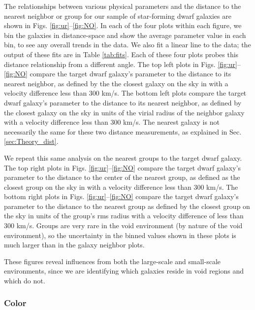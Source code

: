 The relationships between various physical parameters and the distance to the 
nearest neighbor or group for our sample of star-forming dwarf galaxies are 
shown in Figs. \ref{fig:ur}--\ref{fig:NO}.  In each of the four plots within 
each figure, we bin the galaxies in distance-space and show the average 
parameter value in each bin, to see any overall trends in the data.  We also fit 
a linear line to the data; the output of these fits are in Table \ref{tab:fits}.  
Each of these four plots probes this distance relationship from a different 
angle.  The top left plots in Figs. \ref{fig:ur}--\ref{fig:NO} compare the 
target dwarf galaxy's parameter to the distance to its nearest neighbor, as 
defined by the the closest galaxy on the sky in \hMpc with a velocity difference 
less than 300 km/s.  The bottom left plots compare the target dwarf galaxy's 
parameter to the distance to its nearest neighbor, as defined by the closest 
galaxy on the sky in units of the virial radius of the neighbor galaxy with a 
velocity difference less than 300 km/s.  The nearest galaxy is not necessarily 
the same for these two distance measurements, as explained in Sec. 
\ref{sec:Theory_dist}.

We repeat this same analysis on the nearest groups to the target dwarf galaxy.  
The top right plots in Figs. \ref{fig:ur}--\ref{fig:NO} compare the target dwarf 
galaxy's parameter to the distance to the center of the nearest group, as 
defined as the closest group on the sky in \hMpc with a velocity difference less 
than 300 km/s.  The bottom right plots in Figs. \ref{fig:ur}--\ref{fig:NO} 
compare the target dwarf galaxy's parameter to the distance to the nearest group 
as defined by the closest group on the sky in units of the group's rms radius 
with a velocity difference of less than 300 km/s.  Groups are very rare in the 
void environment (by nature of the void environment), so the uncertainty in the 
binned values shown in these plots is much larger than in the galaxy neighbor 
plots.

These figures reveal influences from both the large-scale and small-scale 
environments, since we are identifying which galaxies reside in void regions and 
which do not.


\subsubsection{Color}

